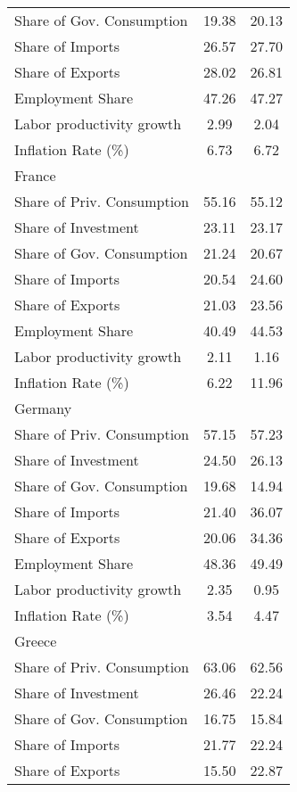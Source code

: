 \begin{center}
\begin{longtable}{lcc}
Share of Gov. Consumption &     19.38 &     20.13 \\  
Share of Imports &     26.57 &     27.70 \\  
Share of Exports &     28.02 &     26.81 \\  
Employment Share &     47.26 &     47.27 \\  
Labor productivity growth &      2.99 &      2.04 \\  
Inflation Rate (\%) &      6.73 &      6.72 \\  
France &  &  \\  
Share of Priv. Consumption &     55.16 &     55.12 \\  
Share of Investment &     23.11 &     23.17 \\  
Share of Gov. Consumption &     21.24 &     20.67 \\  
Share of Imports &     20.54 &     24.60 \\  
Share of Exports &     21.03 &     23.56 \\  
Employment Share &     40.49 &     44.53 \\  
Labor productivity growth &      2.11 &      1.16 \\  
Inflation Rate (\%) &      6.22 &     11.96 \\  
Germany &  &  \\  
Share of Priv. Consumption &     57.15 &     57.23 \\  
Share of Investment &     24.50 &     26.13 \\  
Share of Gov. Consumption &     19.68 &     14.94 \\  
Share of Imports &     21.40 &     36.07 \\  
Share of Exports &     20.06 &     34.36 \\  
Employment Share &     48.36 &     49.49 \\  
Labor productivity growth &      2.35 &      0.95 \\  
Inflation Rate (\%) &      3.54 &      4.47 \\  
Greece &  &  \\  
Share of Priv. Consumption &     63.06 &     62.56 \\  
Share of Investment &     26.46 &     22.24 \\  
Share of Gov. Consumption &     16.75 &     15.84 \\  
Share of Imports &     21.77 &     22.24 \\  
Share of Exports &     15.50 &     22.87 \\  

\end{longtable}
\end{center}
